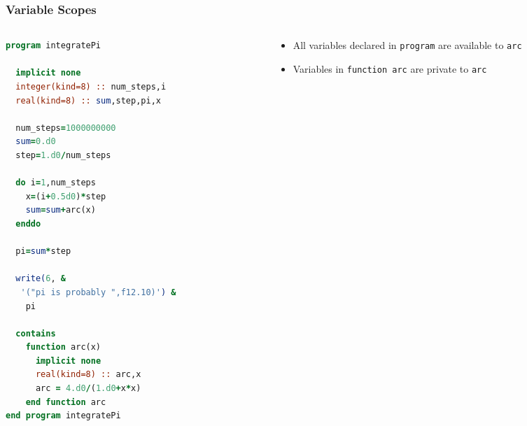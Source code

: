 \documentclass[xcolor=table,10pt,final]{beamer}
\begin{document}
\begin{frame}[fragile]
  \frametitle{Variable Scopes}
  \begin{columns}
    \begin{column}{0.5\textwidth}
  \begin{lstlisting}[language=Fortran,basicstyle=\scriptsize]
program integratePi

  implicit none
  integer(kind=8) :: num_steps,i
  real(kind=8) :: sum,step,pi,x

  num_steps=1000000000
  sum=0.d0
  step=1.d0/num_steps

  do i=1,num_steps
    x=(i+0.5d0)*step
    sum=sum+arc(x)
  enddo

  pi=sum*step

  write(6, &
   '("pi is probably ",f12.10)') &
    pi

  contains
    function arc(x)
      implicit none
      real(kind=8) :: arc,x
      arc = 4.d0/(1.d0+x*x)
    end function arc
end program integratePi
  \end{lstlisting}
\end{column}
\begin{column}{0.5\textwidth}
  \begin{itemize}
    \itemsep 0.3cm
    \item {\color{blue}All variables declared in {\tt program} are available to {\tt arc}}
    \item {\color{red}Variables in {\tt function arc} are private to {\tt arc}}
  \end{itemize}
\end{column}
\end{columns}
\end{frame}
\end{document}
